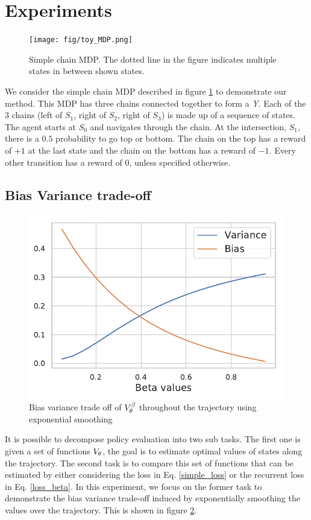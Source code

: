 \section{Experiments}
\begin{figure}[h]
    \centering
    \texttt{[image: fig/toy\_MDP.png]}
    \caption{Simple chain MDP. The dotted line in the figure indicates multiple states in between shown states.}
    \label{fig:toy MDP}
\end{figure}
We consider the simple chain MDP described in figure \ref{fig:toy MDP} to demonstrate our method. This MDP has three chains connected together to form a \emph{Y}. Each of the 3 chains (left of $S_1$, right of $S_2$, right of $S_3$) is made up of a sequence of states. The agent starts at $S_0$ and navigates through the chain. At the intersection, $S_1$, there is a $0.5$ probability to go top or bottom. The chain on the top has a reward of $+1$ at the last state and the chain on the bottom has a reward of $-1$. Every other transition has a reward of $0$, unless specified otherwise.\\
\subsection{Bias Variance trade-off}
\begin{figure}[h]
    \centering
    \includegraphics[scale=0.6]{fig/beta_bias_variance.pdf}
    \caption{Bias variance trade off of $V^{\beta}_{\theta}$ throughout the trajectory using exponential smoothing}
    \label{fig:bias_variance}
\end{figure}
It is possible to decompose policy evaluation into two sub tasks. The first one is given a set of functions $V_{\theta}$, the goal is to estimate optimal values of states along the trajectory. The second task is to compare this set of functions that can be estimated by either considering the loss in Eq. \ref{simple_loss} or the recurrent loss in Eq. \ref{loss_beta}. In this experiment, we focus on the former task to demonstrate the bias variance trade-off induced by exponentially smoothing the values over the trajectory. This is shown in figure \ref{fig:bias_variance}. 

